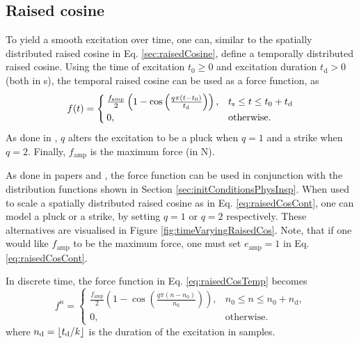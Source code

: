 \subsection{Raised cosine}\label{sec:timeVaryingRaisedCos}
To yield a smooth excitation over time, one can, similar to the spatially distributed raised cosine in Eq. \ref{sec:raisedCosine}, define a temporally distributed raised cosine. Using the time of excitation $t_0\geq 0$ and excitation duration $t_\text{d}>0$ (both in s), the temporal raised cosine can be used as a force function, as
\begin{equation}\label{eq:raisedCosTemp}
    f(t) = 
    \begin{cases}
        \frac{f_\text{amp}}{2} \left(1 - \cos\left(\frac{q\pi (t - t_0)}{t_\text{d}}\right)\right), & t_{\text{s}} \leq t \leq t_0 + t_\text{d}\\
        0, &\text{otherwise}.
    \end{cases}
\end{equation} 
As done in \cite{Webb2015}, $q$ alters the excitation to be a pluck when $q=1$ and a strike when $q=2$. Finally, $f_\text{amp}$ is the maximum force (in N). 

As done in papers \citeP[A] and \citeP[B], the force function can be used in conjunction with the distribution functions shown in Section \ref{sec:initConditionsPhysInsp}. When used to scale a spatially distributed raised cosine as in Eq. \eqref{eq:raisedCosCont}, one can model a pluck or a strike, by setting $q=1$ or $q=2$ respectively. These alternatives are visualised in Figure \ref{fig:timeVaryingRaisedCos}. Note, that if one would like $f_\text{amp}$ to be the maximum force, one must set $e_\text{amp} = 1$ in Eq. \eqref{eq:raisedCosCont}. 

In discrete time, the force function in Eq. \eqref{eq:raisedCosTemp} becomes
\begin{equation}\label{eq:discExcitation}
    f^n = 
    \begin{cases}
        \frac{f_\text{amp}}{2}\left(1-\cos\left(\frac{q\pi (n - n_0)}{n_\text{d}}\right)\right), & n_0 \leq n \leq n_0+n_\text{d},\\
        0, &\text{otherwise}.
    \end{cases}
\end{equation}
where $n_\text{d} = \floor[t_\text{d}/k]$ is the duration of the excitation in samples.


